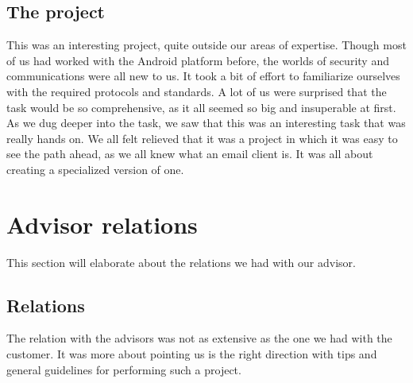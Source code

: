 \subsection{The project}
This was an interesting project, quite outside our areas of expertise. Though most of us had worked with the Android platform before, the worlds of security and communications were all new to us. It took a bit of effort to familiarize ourselves with the required protocols and standards.
\newline
\newline
A lot of us were surprised that the task would be so comprehensive, as it all seemed so big and insuperable at first. As we dug deeper into the task, we saw that this was an interesting task that was really hands on. We all felt relieved that it was a project in which it was easy to see the path ahead, as we all knew what an email client is. It was all about creating a specialized version of one. 

\section{Advisor relations}\label{sec:refl_advisor}
This section will elaborate about the relations we had with our advisor.

\subsection{Relations}
The relation with the advisors was not as extensive as the one we had with the customer. It was more about pointing us is the right direction with tips and general guidelines for performing such a project. 

